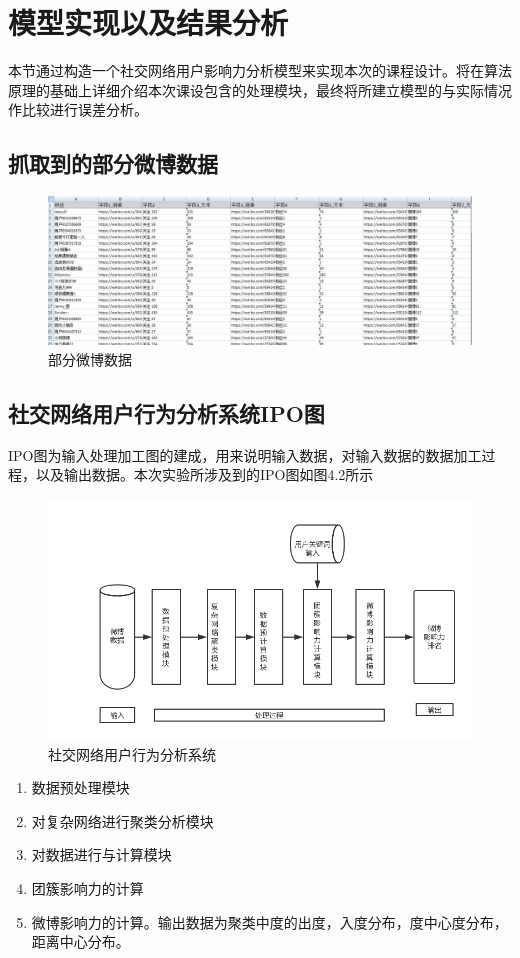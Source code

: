 \chapter{模型实现以及结果分析}
本节通过构造一个社交网络用户影响力分析模型来实现本次的课程设计。将在算法原理的基础上详细介绍本次课设包含的处理模块，最终将所建立模型的与实际情况作比较进行误差分析。
\section{抓取到的部分微博数据}
\begin{figure}[h]
	\centering
	\includegraphics[scale=0.5]{figures/3.png}
	\caption{部分微博数据}
	\label{fig:1}
\end{figure}

\section{社交网络用户行为分析系统IPO图}
IPO图为输入处理加工图的建成，用来说明输入数据，对输入数据的数据加工过程，以及输出数据。本次实验所涉及到的IPO图如图4.2所示
\begin{figure}[h]
	\centering
	\includegraphics[scale=0.5]{figures/4.png}
	\caption{社交网络用户行为分析系统}
	\label{fig:1}
\end{figure}
\begin{enumerate}[(1)]
\item 数据预处理模块
\item 对复杂网络进行聚类分析模块
\item 对数据进行与计算模块
\item 团簇影响力的计算
\item 微博影响力的计算。输出数据为聚类中度的出度，入度分布，度中心度分布，距离中心分布。
\end{enumerate}

